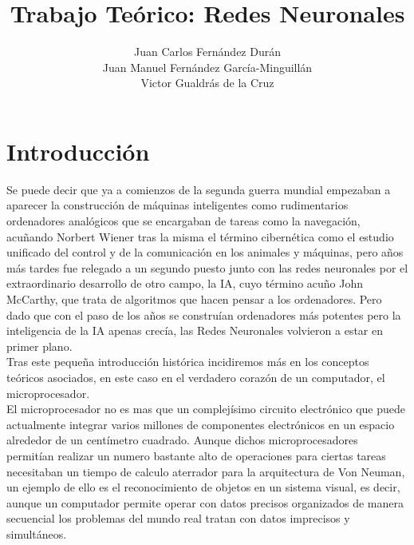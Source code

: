 \documentclass[11pt, oneside]{article}   	%
\begin{document}
\title{Trabajo Teórico: Redes Neuronales}
\author{Juan Carlos Fernández Durán\\
Juan Manuel Fernández García-Minguillán\\
Victor Gualdrás de la Cruz}


\maketitle

\newpage

\tableofcontents

\newpage


\section{Introducción}

Se puede decir que ya a comienzos de la segunda guerra mundial empezaban a aparecer la construcción de máquinas
inteligentes como rudimentarios ordenadores analógicos que se encargaban de tareas como la navegación, acuñando Norbert
Wiener tras la misma el término cibernética como el estudio unificado del control y de la comunicación en los animales y
máquinas, pero años más tardes fue relegado a un segundo puesto junto con las redes neuronales por el extraordinario
desarrollo de otro campo, la IA, cuyo término acuño John McCarthy, que trata de algoritmos que hacen pensar a los
ordenadores. Pero dado que con el paso de los años se construían ordenadores más potentes pero la inteligencia de la IA
apenas crecía, las Redes Neuronales volvieron a estar en primer plano.\\


Tras este pequeña introducción histórica incidiremos más en los conceptos teóricos asociados, en este caso en el
verdadero corazón de un computador, el microprocesador.\\

El microprocesador no es mas que un complejísimo circuito electrónico que puede actualmente integrar varios millones de
componentes electrónicos en un espacio alrededor de un centímetro cuadrado. Aunque dichos microprocesadores permitían
realizar un numero bastante alto de operaciones para ciertas tareas necesitaban un tiempo de calculo aterrador para la
arquitectura de Von Neuman, un ejemplo de ello es el reconocimiento de objetos en un sistema visual, es decir, aunque un
computador permite operar con datos precisos organizados de manera secuencial los problemas del mundo real tratan con
datos imprecisos y simultáneos.\\
\end{document}
